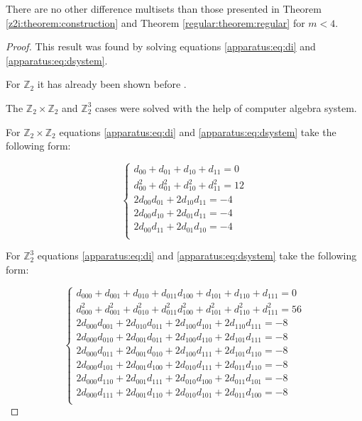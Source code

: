 \begin{theorem}
    There are no other difference multisets than those presented in Theorem \ref{z2i:theorem:construction} and Theorem \ref{regular:theorem:regular} for $m < 4$.
\end{theorem}

\begin{proof}
    This result was found by solving equations \eqref{apparatus:eq:di} and \eqref{apparatus:eq:dsystem}.
    
    For $\mathbb Z_2$ it has already been shown before \cite{buratti1999old}.
    
    The $\mathbb Z_2 \times \mathbb Z_2$ and $\mathbb Z_2^3$ cases were solved with the help of computer algebra system.
    
    For $\mathbb Z_2 \times \mathbb Z_2$ equations \eqref{apparatus:eq:di} and \eqref{apparatus:eq:dsystem} take the following form:
    
    \begin{equation}
        \begin{cases}
            d_{00} + d_{01} + d_{10} + d_{11} = 0 \\
            d_{00}^2 + d_{01}^2 + d_{10}^2 + d_{11}^2 = 12 \\
            2 d_{00}d_{01} + 2 d_{10}d_{11} = -4 \\
            2 d_{00}d_{10} + 2 d_{01}d_{11} = -4 \\
            2 d_{00}d_{11} + 2 d_{01}d_{10} = -4 \\
        \end{cases}
    \end{equation}
    
    For $\mathbb Z_2^3$ equations \eqref{apparatus:eq:di} and \eqref{apparatus:eq:dsystem} take the following form:
    
    \begin{equation}
        \begin{cases}
            d_{000} + d_{001} + d_{010} + d_{011} d_{100} + d_{101} + d_{110} + d_{111} = 0 \\
            d_{000}^2 + d_{001}^2 + d_{010}^2 + d_{011}^2 d_{100}^2 + d_{101}^2 + d_{110}^2 + d_{111}^2 = 56 \\
            2 d_{000}d_{001} + 2 d_{010}d_{011} + 2 d_{100}d_{101} + 2 d_{110}d_{111} = -8 \\
            2 d_{000}d_{010} + 2 d_{001}d_{011} + 2 d_{100}d_{110} + 2 d_{101}d_{111} = -8 \\
            2 d_{000}d_{011} + 2 d_{001}d_{010} + 2 d_{100}d_{111} + 2 d_{101}d_{110} = -8 \\
            2 d_{000}d_{101} + 2 d_{001}d_{100} + 2 d_{010}d_{111} + 2 d_{011}d_{110} = -8 \\
            2 d_{000}d_{110} + 2 d_{001}d_{111} + 2 d_{010}d_{100} + 2 d_{011}d_{101} = -8 \\
            2 d_{000}d_{111} + 2 d_{001}d_{110} + 2 d_{010}d_{101} + 2 d_{011}d_{100} = -8 \\
        \end{cases}
    \end{equation}
    

\end{proof}
